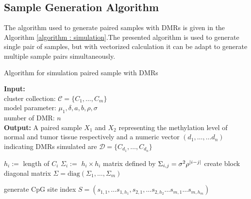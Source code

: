 \documentclass{report}
\begin{document}
\subsection{Sample Generation Algorithm}
\par
The algorithm used to generate paired samples with DMRs is given in the Algorithm \ref{algorithm : simulation}.The
presented algorithm is used to generate single pair of samples, but with vectorized calculation it can
be adapt to generate multiple sample pairs simultaneously.


 \begin{algorithm}
    \caption{Algorithm for simulation paired sample with DMRs} \label{algorithm : simulation}
    \hspace*{0.02in} {\bf Input:} \\
     cluster collection: $\mathcal{C} = \{C_1,\ldots,C_m\}$ \\
     model parameter: $\mu_1, \delta, a, b, \rho, \sigma$ \\
      number of DMR: $n$ \\
     \hspace*{0.02in} {\bf Output:}
       A paired sample $X_1$ and $X_2$ representing the methylation level of normal and tumor tissue respectively and a numeric vector $(d_1,\ldots, \ldots d_n)$ indicating DMRs simulated are $\mathcal{D} = \{C_{d_1}, \ldots, C_{d_n}\}$
       \begin{algorithmic}[1]
            \State $h_i :=$ length of $C_i$ 
            \State $\Sigma_i:=$  $h_i \times h_i$ matrix defined by $\Sigma_{i,j} = \sigma^2 \rho^{\abs{i-j}}$
           \EndFor
           \State create block diagonal matrix $\Sigma = \mathrm{diag}(\Sigma_1, \ldots, \Sigma_m)$
           
           \State generate CpG site index $S = ( s_{1,1},\ldots s_{1, h_1}, s_{2,1},\ldots s_{2, h_2} \ldots s_{m,1} \ldots s_{m,h_m} 
           )$ 
        

\end{algorithmic}
\end{algorithm}
\end{document}
